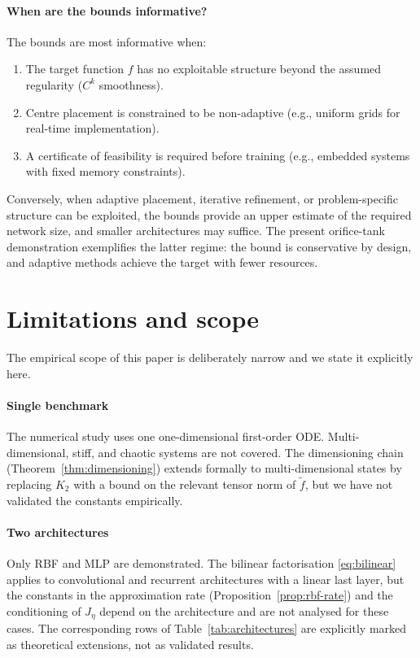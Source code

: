 \documentclass[preprint,12pt,numbers]{elsarticle}
\begin{document}
\paragraph{When are the bounds informative?} The bounds are most informative
when:
\begin{enumerate}[label=(\roman*),leftmargin=*,topsep=2pt,itemsep=1pt]
\item The target function $f$ has no exploitable structure beyond the assumed
      regularity ($C^k$ smoothness).
\item Centre placement is constrained to be non-adaptive (e.g., uniform grids
      for real-time implementation).
\item A certificate of feasibility is required before training (e.g., embedded
      systems with fixed memory constraints).
\end{enumerate}
Conversely, when adaptive placement, iterative refinement, or problem-specific
structure can be exploited, the bounds provide an upper estimate of the
required network size, and smaller architectures may suffice. The present
orifice-tank demonstration exemplifies the latter regime: the bound is
conservative by design, and adaptive methods achieve the target with fewer
resources.


\section{Limitations and scope}
\label{sec:limitations}

The empirical scope of this paper is deliberately narrow and we state it
explicitly here.

\paragraph{Single benchmark} The numerical study uses one
one-dimensional first-order ODE. Multi-dimensional, stiff, and chaotic
systems are not covered. The dimensioning chain
(Theorem~\ref{thm:dimensioning}) extends formally to multi-dimensional
states by replacing $K_2$ with a bound on the relevant tensor norm of
$\tilde{f}$, but we have not validated the constants empirically.

\paragraph{Two architectures} Only RBF and MLP are demonstrated. The
bilinear factorisation \eqref{eq:bilinear} applies to convolutional and
recurrent architectures with a linear last layer, but the constants in
the approximation rate (Proposition~\ref{prop:rbf-rate}) and the
conditioning of $J_\eta$ depend on the architecture and are not analysed
for these cases. The corresponding rows of Table~\ref{tab:architectures}
are explicitly marked as theoretical extensions, not as validated
results.
\end{document}
